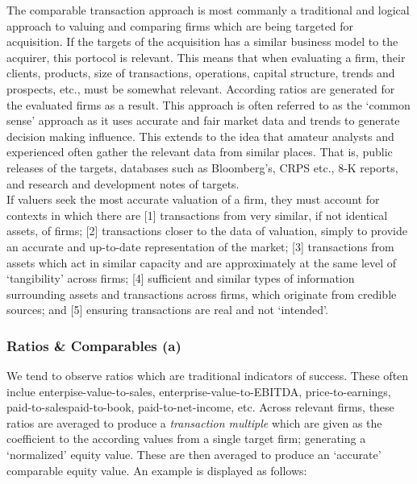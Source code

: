 \documentclass[11pt, english]{article}
\begin{document}
	The comparable transaction approach is most commanly a traditional and logical approach to valuing and comparing firms which are being targeted for acquisition. If the targets of the acquisition has a similar business model to the acquirer, this portocol is relevant. This means that when evaluating a firm, their clients, products, size of transactions, operations, capital structure, trends and prospects, etc., must be somewhat relevant. According ratios are generated for the evaluated firms as a result. This approach is often referred to as the `common sense' approach as it uses accurate and fair market data and trends to generate decision making influence. This extends to the idea that amateur analysts and experienced often gather the relevant data from similar places. That is, public releases of the targets, databases such as Bloomberg's, CRPS etc., 8-K reports, and research and development notes of targets.\\

	If valuers seek the most accurate valuation of a firm, they must account for contexts in which there are [1] transactions from very similar, if not identical assets, of firms; [2] transactions closer to the data of valuation, simply to provide an accurate and up-to-date representation of the market; [3] transactions from assets which act in similar capacity and are approximately at the same level of `tangibility' across firms; [4] sufficient and similar types of information surrounding assets and transactions across firms, which originate from credible sources; and [5] ensuring transactions are real and not `intended'.

		\subsubsection*{Ratios \& Comparables (a)}
	
	We tend to observe ratios which are traditional indicators of success. These often inclue enterpise-value-to-sales, enterprise-value-to-EBITDA, price-to-earnings, paid-to-salespaid-to-book, paid-to-net-income, etc. Across relevant firms, these ratios are averaged to produce a \textit{transaction multiple} which are given as the coefficient to the according values from a single target firm; generating a `normalized' equity value. These are then averaged to produce an `accurate' comparable equity value. An example is displayed as follows:
	
\end{document}

